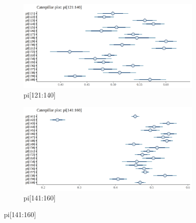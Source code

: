 \documentclass[12pt]{article}
\begin{document}
\begin{figure}[h!]
    \centering
    \begin{subfigure}{0.45\textwidth}
        \includegraphics[width=\linewidth]{pictures/cater121-140.png}
        \caption{pi[121:140]}
        \label{fig:sub2_1}
    \end{subfigure}
    \begin{subfigure}{0.45\textwidth}
        \includegraphics[width=\linewidth]{pictures/cater141-160.png}
        \caption{pi[141:160]}
        \label{fig:sub2_2}
    \end{subfigure}


\end{figure}
\end{document}

